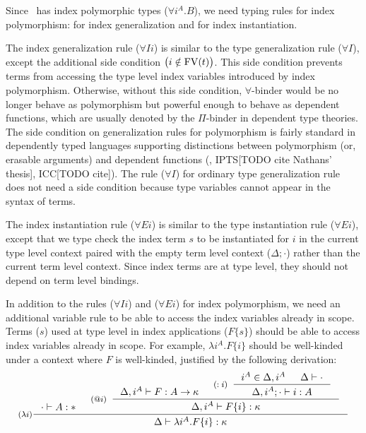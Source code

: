 Since \Fi\ has index polymorphic types ($\forall i^A . B$),
we need typing rules for index polymorphism:
 for index generalization
and  for index instantiation.

The index generalization rule ($\forall I i$) is similar to
the type generalization rule ($\forall I$), except the additional
side condition $\big(i\notin\mathop{\mathrm{FV}}(t)\big)$. This side condition prevents
terms from accessing the type level index variables introduced by index
polymorphism. Otherwise, without this side condition, $\forall$-binder
would be no longer behave as polymorphism but powerful enough to behave as
dependent functions, which are usually denoted by the $\Pi$-binder in
dependent type theories. The side condition on generalization rules
for polymorphism is fairly standard in dependently typed languages supporting
distinctions between polymorphism (or, erasable arguments) and
dependent functions (\eg, IPTS[TODO cite Nathans' thesis], ICC[TODO cite]).
The rule ($\forall I$) for ordinary type generalization rule does not need
a side condition because type variables cannot appear in the syntax of terms.

The index instantiation rule ($\forall E i$) is similar to
the type instantiation rule ($\forall E i$), except that
we type check the index term $s$ to be instantiated for $i$
in the current type level context paired with the empty term level context
($\Delta;\cdot$) rather than the current term level context.
Since index terms are at type level, they should not depend on
term level bindings.

In addition to the rules ($\forall I i$) and ($\forall E i$) for
index polymorphism, we need an additional variable rule 
to be able to access the index variables already in scope. Terms ($s$) used
at type level in index applications ($F\{s\}$) should be able to access
index variables already in scope. For example, $\lambda i^A.F\{i\}$ should be
well-kinded under a context where $F$ is well-kinded,
justified by the following derivation:
\[ \inference[($\lambda i$)]
      { \cdot |- A:* &
	\inference[($@i$)]{ \Delta, i^A |- F : A -> \kappa
                          & \inference[($:i$)]{ i^A\in \Delta,i^A
                                              & \Delta |- \cdot }
                                              {\Delta,i^A;\cdot |- i:A}
                          }
                          {\Delta, i^A |- F\{i\} : \kappa} }
      {\Delta |- \lambda i^A.F\{i\} :\kappa}
\]



